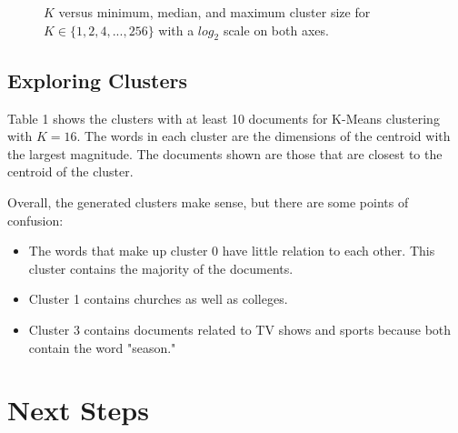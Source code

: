 \documentclass{article} %
\begin{document}
\begin{figure}[h]
\begin{center}
\end{center}
\caption{$K$ versus minimum, median, and maximum cluster size for $K \in \{1,2,4,...,256\}$ with a $log_{2}$ scale on both axes.}
\end{figure}

\subsection{Exploring Clusters}

Table 1 shows the clusters with at least 10 documents for K-Means clustering with $K=16$. The words in each cluster are the dimensions of the centroid with the largest magnitude. The documents shown are those that are closest to the centroid of the cluster.

Overall, the generated clusters make sense, but there are some points of confusion:

\begin{itemize}
\item The words that make up cluster 0 have little relation to each other. This cluster contains the majority of the documents.
\item Cluster 1 contains churches as well as colleges.
\item Cluster 3 contains documents related to TV shows and sports because both contain the word "season."
\end{itemize}

\section{Next Steps}
\end{document}
